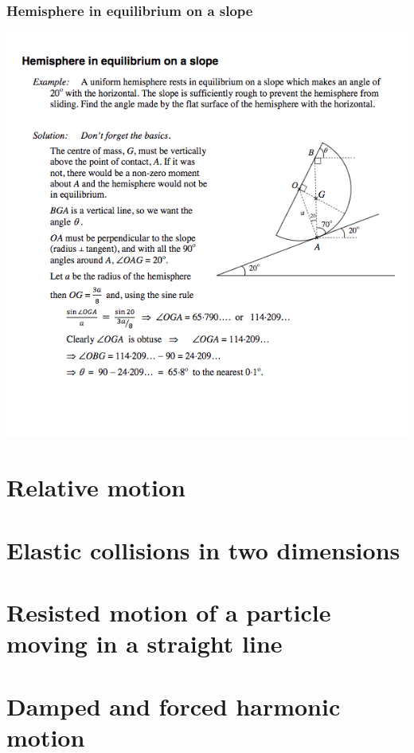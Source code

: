 \documentclass[a4paper]{article}
\begin{document}
\subsubsection{Hemisphere in equilibrium on a slope}
\begin{center}
    \includegraphics[scale=0.5]{img_M/14_eg4}
\end{center}

\section{Relative motion}

\section{Elastic collisions in two dimensions}

\section{Resisted motion of a particle moving in a straight line}

\section{Damped and forced harmonic motion}
\end{document}
